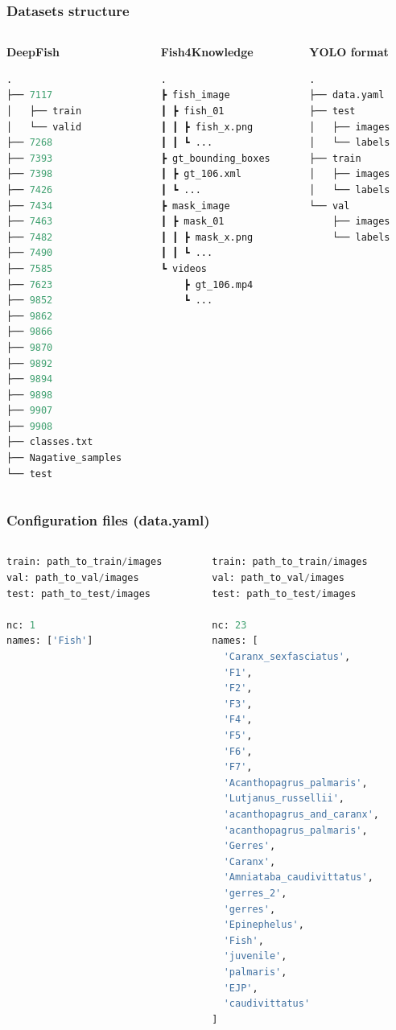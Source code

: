 \documentclass[serif]{beamer}  %
\begin{document}
\begin{frame}[fragile]
\frametitle{Datasets structure}
\begin{columns}
\begin{column}{0.3\textwidth}
\centering
\textbf{DeepFish}
\begin{lstlisting}[language=python]
.
├── 7117
│   ├── train
│   └── valid
├── 7268
├── 7393
├── 7398
├── 7426
├── 7434
├── 7463
├── 7482
├── 7490
├── 7585
├── 7623
├── 9852
├── 9862
├── 9866
├── 9870
├── 9892
├── 9894
├── 9898
├── 9907
├── 9908
├── classes.txt
├── Nagative_samples
└── test
\end{lstlisting}
\end{column}

\begin{column}{0.3\textwidth}
\centering
\textbf{Fish4Knowledge}
\begin{lstlisting}[language=python]
.    
┣ fish_image
┃ ┣ fish_01
┃ ┃ ┣ fish_x.png
┃ ┃ ┗ ...
┣ gt_bounding_boxes
┃ ┣ gt_106.xml
┃ ┗ ...
┣ mask_image
┃ ┣ mask_01
┃ ┃ ┣ mask_x.png
┃ ┃ ┗ ...
┗ videos
    ┣ gt_106.mp4
    ┗ ...

\end{lstlisting}
\end{column}

\begin{column}{0.3\textwidth}
\centering
\textbf{YOLO format}
\begin{lstlisting}[language=python]
.
├── data.yaml
├── test
│   ├── images
│   └── labels
├── train
│   ├── images
│   └── labels
└── val
    ├── images
    └── labels
\end{lstlisting}
\end{column}
\end{columns}
\end{frame}

\begin{frame}[fragile]
\frametitle{Configuration files (data.yaml)}
\begin{columns}
\begin{column}{0.45\textwidth}
\begin{lstlisting}[language=python]
train: path_to_train/images
val: path_to_val/images
test: path_to_test/images

nc: 1
names: ['Fish']
\end{lstlisting}
\end{column}

\begin{column}{0.45\textwidth}
\begin{lstlisting}[language=python]
train: path_to_train/images
val: path_to_val/images
test: path_to_test/images

nc: 23
names: [
  'Caranx_sexfasciatus',
  'F1', 
  'F2',
  'F3', 
  'F4',
  'F5',
  'F6',
  'F7',
  'Acanthopagrus_palmaris',
  'Lutjanus_russellii',
  'acanthopagrus_and_caranx',
  'acanthopagrus_palmaris', 
  'Gerres',
  'Caranx',
  'Amniataba_caudivittatus',
  'gerres_2',
  'gerres',
  'Epinephelus',
  'Fish',
  'juvenile',
  'palmaris',
  'EJP',
  'caudivittatus'
]
\end{lstlisting}
\end{column}
\end{columns}
\end{frame}
\end{document}
